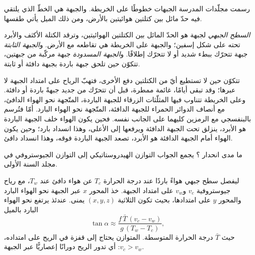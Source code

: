 رسمت مجلّدات المدرسة الجبهات خطوطًا على الخريطة. والجبهة هي الخطّ الذي يلتقي فيه حدّ مائل
بين كتلتين هوائيتين بالأرض، ومن ذلك الميل يأتي طقسها.

\begin{definition}\label{def:b2:weather-systems:fronts}
\emph{السطح الجبهي} لجبهة هو الحدّ المائل بين
الكتلتين الهوائيتين، وترقد الكتلة الأكثف والأبرد تحته على شكل إسفين؛ والجبهة على الخريطة هي
تقاطعه مع الأرض. و\emph{الجبهة الثابتة} جبهة
تتحرّك ببطء شديد أو لا تتحرّك إطلاقًا. و\emph{الجبهة المسدودة}
جبهة مركّبة من جبهتين، تتكوّن حين تلحق جبهة باردة بجبهة دافئة أو ثابتة.
\end{definition}

تتكوّن  حين لا تستطيع أيّ من الكتلتين دفع الأخرى، فتهبّ الرياح على امتداد
الجبهة لا عبرها؛ وقد تبقى أيامًا، غائمة ممطرة، قبل أن تتحرّك من جديد جبهةً باردة
أو دافئة. وعلى الخريطة تتناوب فيها المثلّثات الزرقاء للجبهة الباردة، المتّجهة نحو
الهواء الدافئ، مع أنصاف الدوائر الحمراء للجبهة الدافئة، المتّجهة نحو الهواء البارد. أمّا  فتُرسم بالبنفسجي مع الرمزين كليهما على الجانب نفسه. فحين يكون الهواء خلف الجبهة الباردة
هو الأبرد، ينزلق تحت الجبهة الدافئة ويرفعها إلى الأعلى، وهذا انسداد بارد؛ وحين يكون الهواء
أمام الجبهة الدافئة هو الأبرد، تصعد الجبهة الباردة فوقه، وهذا انسداد دافئ.

ما مدى انحدار ؟ يجمع الجواب التوازن الهيدروستاتيكي إلى التوازن
الجيوستروفي في مجلد السنة الأولى.

\begin{proposition}\label{prop:b2:weather-systems:slope}
ليفصل سطح جبهي هواءً باردًا عند درجة الحرارة $T_c$ عن هواء دافئ عند $T_w$، مع
رياح جيوستروفية $v_c$ و$v_w$ على امتداد الجبهة. خذ المحور $x$ عبر الجبهة نحو
الهواء البارد والمحور $y$ على امتدادها، بحيث تكون الثلاثية $(x, y, z)$ يمنى. عندئذ يرتفع  نحو الهواء البارد بالميل
\[
  \tan\alpha \approx \frac{f\,\bar T\,(v_c - v_w)}{g\,(T_w - T_c)},
\]
حيث $\bar T$ درجة الحرارة المتوسطة.  المتوازن يحتاج إلى قفزة في الريح
على امتداده، $v_c > v_w$: أي تدور الريح دورانًا إعصاريًّا عبر الجبهة.
\end{proposition}

